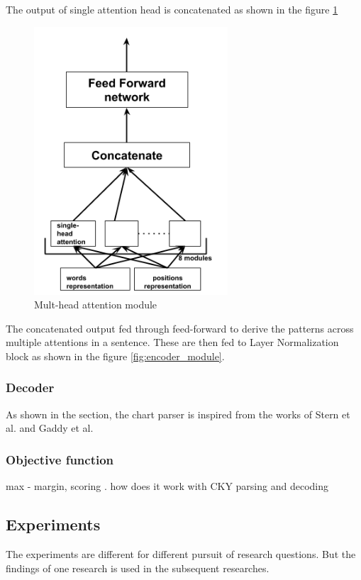 \documentclass[a4paper, 11pt]{article}
\begin{document}
The output of single attention head is concatenated as shown in the figure \ref{fig:multi_head_attention_module}
\begin{figure}[htpb]
    \centering
    \includegraphics[width=\textwidth,height=10cm,keepaspectratio=true]
    {multi-head-attention.png}
    \caption{
        Mult-head attention module
    }
    \label{fig:multi_head_attention_module}
\end{figure}

The concatenated output fed through feed-forward to derive the patterns across multiple attentions in a sentence. These are then fed to Layer Normalization block as shown in the figure \ref{fig:encoder_module}.

\subsubsection{Decoder}
As shown in the section, the chart parser is inspired from the works of Stern et al. and Gaddy et al.

\subsubsection{Objective function}
max - margin, scoring . how does it work with CKY parsing and decoding

\subsection{Experiments}

The experiments are different for different pursuit of research questions. But the findings of one research is used in the subsequent researches. 
\end{document}
